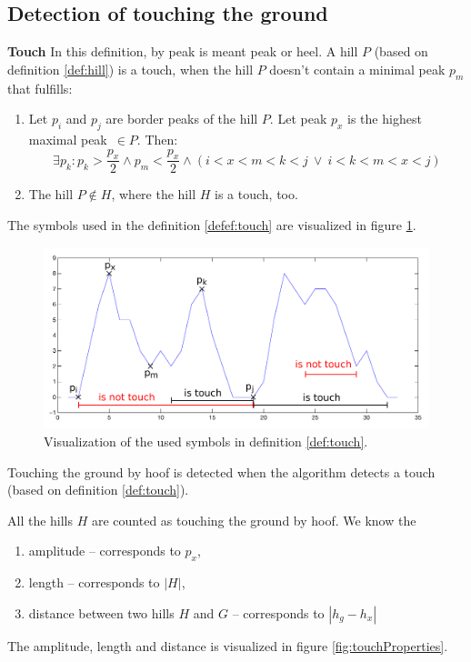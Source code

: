 \subsection{Detection of touching the ground}
\begin{definition}{\textbf{Touch}}
	\label{def:touch}
	In this definition, by peak is meant peak or heel. A hill $P$ (based on definition \ref{def:hill}) is a touch, when the hill $P$ doesn't contain a minimal peak $p_m$ that fulfills:
	\begin{enumerate}
		\item Let $p_i$ and $p_j$ are border peaks of the hill $P$. Let peak $p_x$ is the highest maximal peak~$\in P$. Then:
		$$\exists p_k : p_k > \dfrac{p_x}{2} \land p_m < \dfrac{p_x}{2} \land (i < x < m < k < j \:\lor\: i < k < m < x < j)$$
		\item The hill $P \notin H$, where the hill $H$ is a touch, too.
	\end{enumerate}
\end{definition}

\begin{remark}
	The symbols used in the definition \ref{defef:touch} are visualized in figure \ref{fig:touchDefinition}.
\end{remark}

\begin{figure}
	\centering
	\label{fig:touchDefinition}
	\caption{Visualization of the used symbols in definition \ref{def:touch}.}
	\includegraphics[width=\linewidth]{img/touchHillDefinition.pdf}
\end{figure}

Touching the ground by hoof is detected when the algorithm detects a touch (based on definition \ref{def:touch}).

All the hills $H$ are counted as touching the ground by hoof. We know the
\begin{enumerate}
	\item amplitude -- corresponds to $p_x$,
	\item length -- corresponds to $|H|$,
	\item distance between two hills $H$ and $G$ -- corresponds to $|h_g - h_x|$
\end{enumerate}
The amplitude, length and distance is visualized in figure \ref{fig:touchProperties}.

